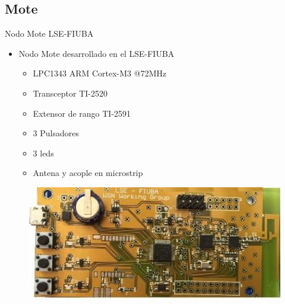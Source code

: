 \documentclass[aspectratio=169]{beamer}
\begin{document}
\subsection[Mote]{Mote}
\begin{frame}{Nodo Mote LSE-FIUBA} 

\begin{minipage}[c]{1.0\linewidth}
	\begin{minipage}[c]{0.6\linewidth}
		\begin{itemize}
			\item Nodo Mote desarrollado en el LSE-FIUBA
			\vspace{15px}
			\begin{itemize}
				\item LPC1343 ARM Cortex-M3 @72MHz
				\vspace{5px}
				\item Transceptor TI-2520
				\vspace{5px}
				\item Extensor de rango TI-2591
				\vspace{5px}
				\item 3 Pulsadores
				\vspace{5px}
				\item 3 leds
				\vspace{5px}
				\item Antena y acople en microstrip
			\end{itemize}
			\vspace{10px}
		\end{itemize}
	\end{minipage}
	\begin{minipage}[c]{0.35\linewidth}
		\begin{figure}[H]
			\includegraphics[width=1\textwidth]{./imagenes/mote.jpg}
			\label{Mote LSE}
		\end{figure}	  	  	
	\end{minipage}
\end{minipage}
\end{frame}
\end{document}
